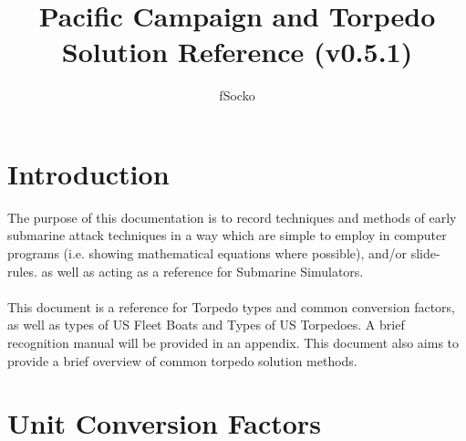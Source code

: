 \documentclass{article}
\author{fSocko}
\title{Pacific Campaign and Torpedo Solution Reference (v0.5.1)}
\begin{document}
\maketitle
\pagebreak
\tableofcontents
\pagebreak

\section{Introduction}

The purpose of this documentation is to record techniques and methods of early submarine attack techniques in a way which are simple to employ in computer programs (i.e. showing mathematical equations where possible), and/or slide-rules. as well as acting as a reference for Submarine Simulators.
\\ \\
This document is a reference for Torpedo types and common conversion factors, as well as types of US Fleet Boats and Types of US Torpedoes. A brief recognition manual will be provided in an appendix. This document also aims to provide a brief overview of common torpedo solution methods.

\section{Unit Conversion Factors}
\vspace{12pt}
\end{document}
